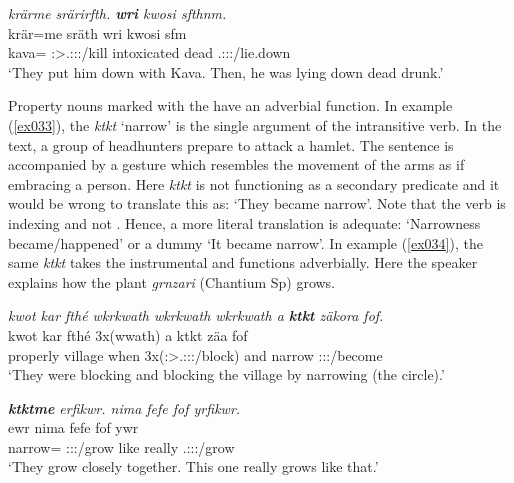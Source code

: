 \begin{exe}
	\ex \emph{krärme srärirfth. \textbf{wri} kwosi sfthnm.}\\
	\gll krär=me sräth wri kwosi sfm\\
	kava=\Ins{} \Stpl:\Sbj>\Tsg.\Masc:\Obj:\Irr:\Pfv/kill intoxicated dead \Tsg{}.\Masc:\Sbj:\Pst:\Dur/lie.down\\
	\trans `They put him down with Kava. Then, he was lying down dead drunk.'\\ 
	\label{ex042}
\end{exe}

Property nouns marked with the   have an adverbial function. In example (\ref{ex033}), the  \emph{ktkt} `narrow' is the single argument of the intransitive verb. In the text, a group of headhunters prepare to attack a hamlet. The sentence is accompanied by a gesture which resembles the movement of the arms as if embracing a person. Here \emph{ktkt} is not functioning as a secondary predicate and it would be wrong to translate this as: `They became narrow'. Note that the verb is indexing \Stsg{} and not \Stnsg{}. Hence, a more literal translation is adequate: `Narrowness became/happened' or a dummy  `It became narrow'. In example (\ref{ex034}), the same  \emph{ktkt} takes the instrumental  and functions adverbially. Here the speaker explains how the plant \emph{grnzari} (Chantium Sp) grows.

\begin{exe}
	\ex \emph{kwot kar fthé wkrkwath wkrkwath wkrkwath a \textbf{ktkt} zäkora fof.}\\
	\gll kwot kar fthé 3x(wwath) a {ktkt} zäa fof\\
	properly village when 3x(\Stpl:\Sbj>\Tsg.\F:\Obj:\Pst:\Ipfv/block) and narrow \Stsg:\Sbj:\Pst:\Pfv/become \Emph{}\\
	\trans `They were blocking and blocking the village by narrowing (the circle).'\\ 
	\label{ex033}
\end{exe}
\begin{exe}
	\ex \emph{\textbf{ktktme} erfikwr. nima fefe fof yrfikwr.}\\
	 ewr nima fefe fof ywr\\
	narrow=\Ins{} \Stpl:\Sbj:\Nonpast:\Ipfv/grow like really \Emph{} \Tsg.\Masc:\Sbj:\Nonpast:\Ipfv/grow\\
	\trans `They grow closely together. This one really grows like that.'\\ 
	\label{ex034}
\end{exe}

